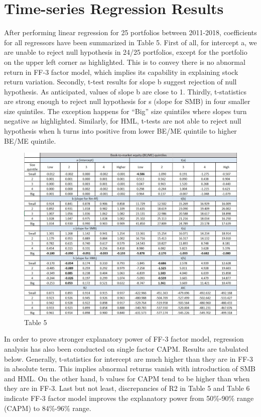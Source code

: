 \documentclass[12pt]{article}
\begin{document}
\section{Time-series Regression Results}


After performing linear regression for 25 portfolios between 2011-2018, coefficients for all regressors have been summarized in Table 5. First of all, for intercept a, we are unable to reject null hypothesis in 24/25 portfolios, except for the portfolio on the upper left corner as highlighted. This is to convey there is no abnormal return in FF-3 factor model, which implies its capability in explaining stock return variation. Secondly, t-test results for slope b suggest rejection of null hypothesis. As anticipated, values of slope b are close to 1. Thirdly, t-statistics are strong enough to reject null hypothesis for s (slope for SMB) in four smaller size quintiles. The exception happens for “Big” size quintiles where slopes turn negative as highlighted. Similarly, for HML, t-tests are not able to reject null hypothesis when h turns into positive from lower BE/ME quintile to higher BE/ME quintile.

\begin{figure}[h]
	\centering
	\includegraphics[width=1\linewidth]{5.JPG}
	\caption*{Table 5}
	\label{fig:label}
\end{figure}


\noindent In order to prove stronger explanatory power of FF-3 factor model, regression analysis has also been conducted on single factor CAPM. Results are tabulated below. Generally, t-statistics for intercept are much higher than they are in FF-3 in absolute term. This implies abnormal returns vanish with introduction of SMB and HML. On the other hand, b values for CAPM tend to be higher than when they are in FF-3. Last but not least, discrepancies of R2 in Table 5 and Table 6 indicate FF-3 factor model improves the explanatory power from 50\%-90\% range (CAPM) to 84\%-96\% range.
\end{document}
